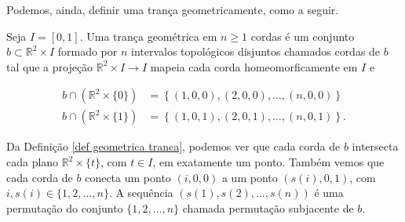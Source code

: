 	
	
	
	\par\vspace{0.3cm} Podemos, ainda, definir uma trança geometricamente, como a seguir.
	
	\begin{deff}
		\label{def geometrica tranca}
		Seja $I = [0,1]$. Uma trança geométrica em $n\geq 1$ cordas é um conjunto $b\subset\mathbb{R}^2\times I$ formado por $n$ intervalos topológicos disjuntos chamados cordas de $b$ tal que a projeção $\mathbb{R}^2\times I\to I$ mapeia cada corda homeomorficamente em $I$ e 
		
		\begin{align*}
		b\cap (\mathbb{R}^2\times \{ 0 \}) &= \left\{ (1,0,0), (2,0,0), \dots, (n,0,0) \right\} \\
		b\cap (\mathbb{R}^2\times \{ 1 \}) &= \left\{ (1,0,1), (2,0,1), \dots, (n,0,1) \right\}.
		\end{align*}
	\end{deff}
	
	\par\vspace{0.3cm} Da Definição \eqref{def geometrica tranca}, podemos ver que cada corda de $b$ intersecta cada plano $\mathbb{R}^2\times\{t\}$, com $t\in I$, em exatamente um ponto. Também vemos que cada corda de $b$ conecta um ponto $(i,0,0)$ a um ponto $(s(i), 0, 1)$, com $i,s(i)\in \{1, 2, \dots, n\}$. A sequência $(s(1), s(2), \dots, s(n))$ é uma permutação do conjunto $\{1, 2, \dots, n\}$ chamada permutação subjacente de $b$.
	
